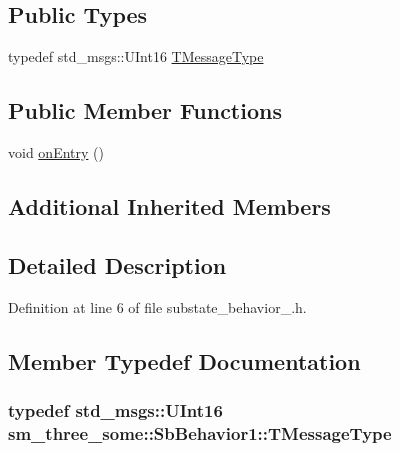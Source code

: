 \subsection*{Public Types}
\begin{DoxyCompactItemize}
\item 
typedef std\+\_\+msgs\+::\+U\+Int16 \hyperlink{classsm__three__some_1_1SbBehavior1_a01ba98cab79a1b707075ce6a01b61ecc}{T\+Message\+Type}
\end{DoxyCompactItemize}
\subsection*{Public Member Functions}
\begin{DoxyCompactItemize}
\item 
void \hyperlink{classsm__three__some_1_1SbBehavior1_abe181acf70706c44c765a20d6a9dab6b}{on\+Entry} ()
\end{DoxyCompactItemize}
\subsection*{Additional Inherited Members}


\subsection{Detailed Description}


Definition at line 6 of file substate\+\_\+behavior\+\_.\+h.



\subsection{Member Typedef Documentation}
\subsubsection[{\texorpdfstring{T\+Message\+Type}{TMessageType}}]{\setlength{\rightskip}{0pt plus 5cm}typedef std\+\_\+msgs\+::\+U\+Int16 {\bf sm\+\_\+three\+\_\+some\+::\+Sb\+Behavior1\+::\+T\+Message\+Type}}\hypertarget{classsm__three__some_1_1SbBehavior1_a01ba98cab79a1b707075ce6a01b61ecc}{}\label{classsm__three__some_1_1SbBehavior1_a01ba98cab79a1b707075ce6a01b61ecc}


